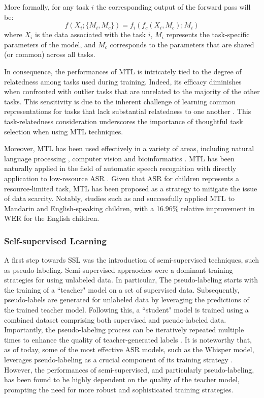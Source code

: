 More formally, for any task $i$ the corresponding output of the forward pass will be:
\begin{equation} \label{equation:MT}
    f(X_i;\{M_i, M_{c}\}) = f_i(f_{c}(X_i,{M_{c}}); {M_i}) 
\end{equation}
where $X_i$ is the data associated with the task $i$, $M_i$ represents the task-specific parameters of the model, and $M_{c}$ corresponds to the parameters that are shared (or common) across all tasks.

In consequence, the performances of \ac{MTL} is intricately tied to the degree of relatedness among tasks used during training. Indeed, its efficacy diminishes when confronted with outlier tasks that are unrelated to the majority of the other tasks. This sensitivity is due to the inherent challenge of learning common representations for tasks that lack substantial relatedness to one another \cite{zhang2018overview}. This task-relatedness consideration underscores the importance of thoughtful task selection when using \ac{MTL} techniques.

Moreover, \ac{MTL} has been used effectively in a variety of areas, including natural language processing \cite{multi-nlp}, computer vision \cite{mtl_computervision} and bioinformatics \cite{bioinfo}. \ac{MTL} has been naturally applied in the field of automatic speech recognition \cite{MTL-LFMMI} with directly application to low-resource \ac{ASR} \cite{abad2020}. Given that \ac{ASR} for children represents a resource-limited task, \ac{MTL} has been proposed as a strategy to mitigate the issue of data scarcity. Notably, studies such as \cite{TransferLF} and \cite{2019multi} successfully applied \ac{MTL} to Mandarin and English-speaking children, with a 16.96\% relative improvement in \ac{WER} for the English children.

\subsubsection{Self-supervised Learning}
A first step towards \ac{SSL} was the introduction of semi-supervised techniques, such as pseudo-labeling. Semi-supervised appraoches were a dominant training strategies for using unlabeled data. In particular, The pseudo-labeling starts with the training of a ``teacher" model on a set of supervised data. Subsequently, pseudo-labels are generated for unlabeled data by leveraging the predictions of the trained teacher model. Following this, a ``student" model is trained using a combined dataset comprising both supervised and pseudo-labeled data. Importantly, the pseudo-labeling process can be iteratively repeated multiple times to enhance the quality of teacher-generated labels \cite{zavaliagkos1998utilizing,ma2006unsupervised}. It is noteworthy that, as of today, some of the most effective \ac{ASR} models, such as the Whisper model, leverages pseudo-labeling as a crucial component of its training strategy \cite{radford2023robust}. However, the performances of semi-supervised, and particularly pseudo-labeling, has been found to be highly dependent on the quality of the teacher model, prompting the need for more robust and sophisticated training strategies.

